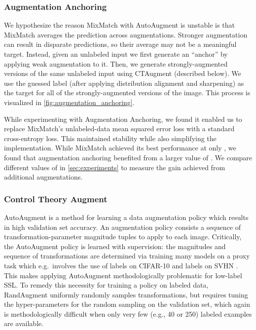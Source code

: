 \documentclass{article} \usepackage{iclr2020_conference,times}
\begin{document}
\subsubsection{Augmentation Anchoring}

We hypothesize the reason MixMatch with AutoAugment is unstable is that MixMatch averages the prediction across  augmentations.
Stronger augmentation can result in disparate predictions, so their average may not be a meaningful target.
Instead, given an unlabeled input we first generate an ``anchor'' by applying weak augmentation to it.
Then, we generate  strongly-augmented versions of the same unlabeled input using CTAugment (described below).
We use the guessed label (after applying distribution alignment and sharpening) as the target for all of the  strongly-augmented versions of the image.
This process is visualized in \cref{fig:augmentation_anchoring}.

While experimenting with Augmentation Anchoring, we found it enabled us to replace MixMatch's unlabeled-data mean squared error loss with a standard cross-entropy loss.
This maintained stability while also simplifying the implementation.
While MixMatch achieved its best performance at only , we found that augmentation anchoring benefited from a larger value of .
We compare different values of  in \cref{sec:experiments} to measure the gain achieved from additional augmentations.

\subsubsection{Control Theory Augment} 
\label{sec:ctaugment}
AutoAugment \citep{cubuk2018autoaugment} is a method for learning a data augmentation policy which results in high validation set accuracy.
An augmentation policy consists a sequence of transformation-parameter magnitude tuples to apply to each image.
Critically, the AutoAugment policy is learned with supervision: 
the magnitudes and sequence of transformations are determined
via training many models on a proxy task which e.g.\ involves the use of  labels on
CIFAR-10 and  labels on SVHN \citep{cubuk2018autoaugment}.
This makes applying AutoAugment methodologically problematic for low-label SSL.
To remedy this necessity for training a policy on labeled data,
RandAugment \citep{cubuk2019randaugment} uniformly randomly samples transformations,
but requires tuning the hyper-parameters for the random sampling on the validation set,
which again is methodologically difficult when only very few (e.g., 40 or 250)
labeled examples are available.
\end{document}
